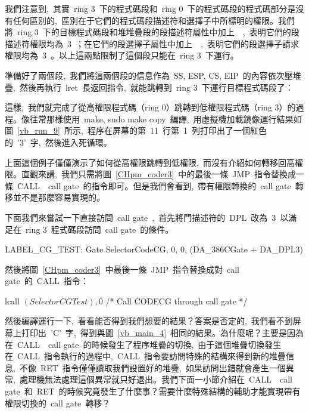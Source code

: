 我們注意到,~其實~ring 3~下的程式碼段和~ring 0~下的程式碼段的程式碼部分是沒有任何區別的,~區別在于它們的程式碼段描述符和選擇子中所標明的權限。我們將~ring 3~下的目標程式碼段和堆堆疊段的段描述符屬性中加上~~,~表明它們的段描述符權限均為~3~；在它們的段選擇子屬性中加上~~,~表明它們的段選擇子請求權限均為~3~。以上這兩點限制了這個段只能在~ring 3~下運行。

準備好了兩個段,~我們將這兩個段的信息作為~SS, ESP, CS, EIP~的內容依次壓堆疊,~然後再執行~lret~長返回指令,~就能跳轉到~ring 3~下運行目標程式碼段了：

\label{CHpm_coder3_init}

這樣,~我們就完成了從高權限程式碼（ring 0）跳轉到低權限程式碼（ring 3）的過程。像往常那樣使用~make, sudo make copy~編譯,~用虛擬機加載鏡像運行結果如圖~\ref{vb_run_9}~所示,~程序在屏幕的第~11~行第~1~列打印出了一個紅色的~'3'~字,~然後進入死循環。


上面這個例子僅僅演示了如何從高權限跳轉到低權限,~而沒有介紹如何轉移回高權限。直觀來講,~我們只需將圖~\ref{CHpm_coder3}~中的最後一條~JMP~指令替換成一條~CALL~~call gate~的指令即可。但是我們會看到,~帶有權限轉換的~call gate~轉移並不是那麼容易實現的。

下面我們來嘗試一下直接訪問~call gate~,~首先將門描述符的~DPL~改為~3~以滿足在~ring 3~程式碼段訪問~call gate~的條件。

\begin{Command}
LABEL_CG_TEST:      Gate    SelectorCodeCG, 0, 0, (DA_386CGate + DA_DPL3)
\end{Command}

然後將圖~\ref{CHpm_coder3}~中最後一條~JMP~指令替換成對~call gate~的~CALL~指令：

\begin{Command}
lcall   $(SelectorCGTest), $0  /* Call CODECG through call gate */
\end{Command}

然後編譯運行一下,~看看能否得到我們想要的結果？答案是否定的,~我們看不到屏幕上打印出~'C'~字,~得到與圖~\ref{vb_main_4}~相同的結果。為什麼呢？主要是因為在~CALL~~call gate~的時候發生了程序堆疊的切換,~由于這個堆疊切換發生在~CALL~指令執行的過程中,~CALL~指令要訪問特殊的結構來得到新的堆疊信息,~不像~RET~指令僅僅讀取我們設置好的堆疊,~如果訪問出錯就會產生一個異常,~處理機無法處理這個異常就只好退出。我們下面一小節介紹在~CALL~~call gate~和~RET~的時候究竟發生了什麼事？需要什麼特殊結構的輔助才能實現帶有權限切換的~call gate~轉移？


